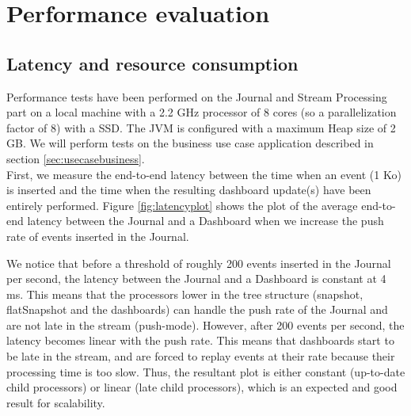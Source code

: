 \section{Performance evaluation}
\label{sec:perfeval}

\subsection{Latency and resource consumption}

Performance tests have been performed on the Journal and Stream Processing part on a local machine with a 2.2 GHz processor of 8 cores (so a parallelization factor of 8) with a SSD. The JVM is configured with a maximum Heap size of 2 GB. We will perform tests on the business use case application described in section \ref{sec:usecasebusiness}.
\\

First, we measure the end-to-end latency between the time when an event (1 Ko) is inserted and the time when the resulting dashboard update(s) have been entirely performed. Figure \ref{fig:latencyplot} shows the plot of the average end-to-end latency between the Journal and a Dashboard when we increase the push rate of events inserted in the Journal.

We notice that before a threshold of roughly 200 events inserted in the Journal per second, the latency between the Journal and a Dashboard is constant at 4 ms. This means that the processors lower in the tree structure (snapshot, flatSnapshot and the dashboards) can handle the push rate of the Journal and are not late in the stream (push-mode).
However, after 200 events per second, the latency becomes linear with the push rate. This means that dashboards start to be late in the stream, and are forced to replay events at their rate because their processing time is too slow. Thus, the resultant plot is either constant (up-to-date child processors) or linear (late child processors), which is an expected and good result for scalability.
\\

